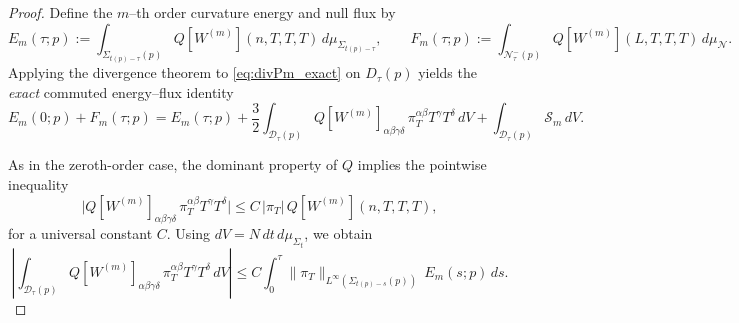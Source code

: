 \documentclass{amsart}
\begin{document}
{\begin{proof}
\medskip

\noindent
Define the $m$--th order curvature energy and null flux by
\[
E_m(\tau;p):=\int_{\Sigma_{t(p)-\tau}(p)} Q[W^{(m)}](n,T,T,T)\,d\mu_{\Sigma_{t(p)-\tau}},
\qquad
F_m(\tau;p):=\int_{\mathcal N^-_\tau(p)} Q[W^{(m)}](L,T,T,T)\,d\mu_{\mathcal N}.
\]
Applying the divergence theorem to \eqref{eq:divPm_exact} on $D_{\tau}(p)$ yields the \emph{exact}
commuted energy--flux identity
\begin{equation}
\label{eq:cone_identity_m_exact}
E_m(0;p)+F_m(\tau;p)
=
E_m(\tau;p)
+\frac{3}{2}\int_{\mathcal D_\tau(p)} Q[W^{(m)}]_{\alpha\beta\gamma\delta}\,\pi_T^{\alpha\beta}T^\gamma T^\delta\,dV
+\int_{\mathcal D_\tau(p)}\mathcal S_m\,dV.
\end{equation}

\medskip
\noindent As in the zeroth-order case, the dominant property of $Q$ implies the pointwise inequality
\begin{equation}
\label{eq:defterm_m_pointwise}
\big|Q[W^{(m)}]_{\alpha\beta\gamma\delta}\,\pi_T^{\alpha\beta}T^\gamma T^\delta\big|
\le
C\,|\pi_T|\,Q[W^{(m)}](n,T,T,T),
\end{equation}
for a universal constant $C$.  Using $dV=N\,dt\,d\mu_{\Sigma_t}$, we obtain
\begin{equation}
\label{eq:defterm_m}
\left|\int_{\mathcal D_\tau(p)} Q[W^{(m)}]_{\alpha\beta\gamma\delta}\,\pi_T^{\alpha\beta}T^\gamma T^\delta\,dV\right|
\le
C\int_0^\tau \|\pi_T\|_{L^\infty(\Sigma_{t(p)-s}(p))}\,E_m(s;p)\,ds.
\end{equation}

\medskip


\end{proof}}
\end{document}
